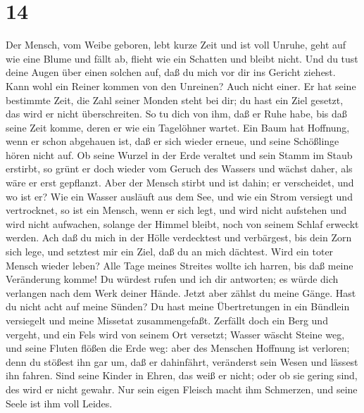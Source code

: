 \hypertarget{section-13}{%
\section{14}\label{section-13}}

 Der Mensch, vom Weibe geboren, lebt kurze Zeit und ist voll
Unruhe,  geht auf wie eine Blume und fällt ab, flieht wie
ein Schatten und bleibt nicht.  Und du tust deine Augen über
einen solchen auf, daß du mich vor dir ins Gericht ziehest. 
Kann wohl ein Reiner kommen von den Unreinen? Auch nicht einer.
 Er hat seine bestimmte Zeit, die Zahl seiner Monden steht
bei dir; du hast ein Ziel gesetzt, das wird er nicht überschreiten.
 So tu dich von ihm, daß er Ruhe habe, bis daß seine Zeit
komme, deren er wie ein Tagelöhner wartet.  Ein Baum hat
Hoffnung, wenn er schon abgehauen ist, daß er sich wieder erneue, und
seine Schößlinge hören nicht auf.  Ob seine Wurzel in der
Erde veraltet und sein Stamm im Staub erstirbt,  so grünt er
doch wieder vom Geruch des Wassers und wächst daher, als wäre er erst
gepflanzt.  Aber der Mensch stirbt und ist dahin; er
verscheidet, und wo ist er?  Wie ein Wasser ausläuft aus
dem See, und wie ein Strom versiegt und vertrocknet,  so
ist ein Mensch, wenn er sich legt, und wird nicht aufstehen und wird
nicht aufwachen, solange der Himmel bleibt, noch von seinem Schlaf
erweckt werden.  Ach daß du mich in der Hölle verdecktest
und verbärgest, bis dein Zorn sich lege, und setztest mir ein Ziel, daß
du an mich dächtest.  Wird ein toter Mensch wieder leben?
Alle Tage meines Streites wollte ich harren, bis daß meine Veränderung
komme!  Du würdest rufen und ich dir antworten; es würde
dich verlangen nach dem Werk deiner Hände.  Jetzt aber
zählst du meine Gänge. Hast du nicht acht auf meine Sünden?
 Du hast meine Übertretungen in ein Bündlein versiegelt und
meine Missetat zusammengefaßt.  Zerfällt doch ein Berg und
vergeht, und ein Fels wird von seinem Ort versetzt;  Wasser
wäscht Steine weg, und seine Fluten flößen die Erde weg: aber des
Menschen Hoffnung ist verloren;  denn du stößest ihn gar
um, daß er dahinfährt, veränderst sein Wesen und lässest ihn fahren.
 Sind seine Kinder in Ehren, das weiß er nicht; oder ob sie
gering sind, des wird er nicht gewahr.  Nur sein eigen
Fleisch macht ihm Schmerzen, und seine Seele ist ihm voll Leides.

